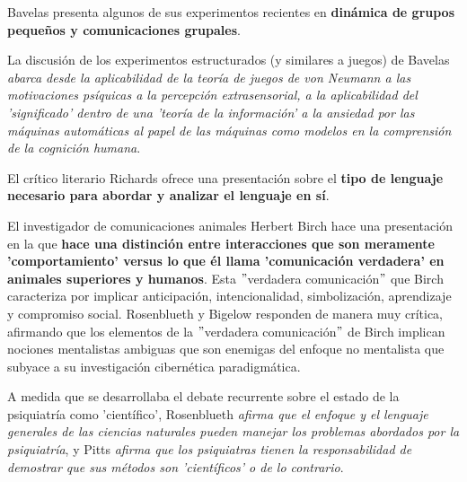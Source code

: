 \documentclass[11pt]{article}
\begin{document}
		Bavelas presenta algunos de sus experimentos recientes en \textbf{dinámica de grupos pequeños y comunicaciones grupales}.\par
		La discusión de los experimentos estructurados (y similares a juegos) de Bavelas \textit{abarca desde la aplicabilidad de la teoría de juegos de von Neumann a las motivaciones psíquicas a la percepción extrasensorial, a la aplicabilidad del 'significado' dentro de una 'teoría de la información' a la ansiedad por las máquinas automáticas al papel de las máquinas como modelos en la comprensión de la cognición humana}.\par
		El crítico literario Richards ofrece una presentación sobre el \textbf{tipo de lenguaje necesario para abordar y analizar el lenguaje en sí}.\par
		El investigador de comunicaciones animales Herbert Birch hace una presentación en la que \textbf{hace una distinción entre interacciones que son meramente 'comportamiento' versus lo que él llama 'comunicación verdadera' en animales superiores y humanos}. Esta $"$verdadera comunicación$"$ que Birch caracteriza por implicar anticipación, intencionalidad, simbolización, aprendizaje y compromiso social. Rosenblueth y Bigelow responden de manera muy crítica, afirmando que los elementos de la $"$verdadera comunicación$"$ de Birch implican nociones mentalistas ambiguas que son enemigas del enfoque no mentalista que subyace a su investigación cibernética paradigmática.\par
		A medida que se desarrollaba el debate recurrente sobre el estado de la psiquiatría como 'científico', Rosenblueth \textit{afirma que el enfoque y el lenguaje generales de las ciencias naturales pueden manejar los problemas abordados por la psiquiatría}, y Pitts \textit{afirma que los psiquiatras tienen la responsabilidad de demostrar que sus métodos son 'científicos' o de lo contrario}.
\end{document}
